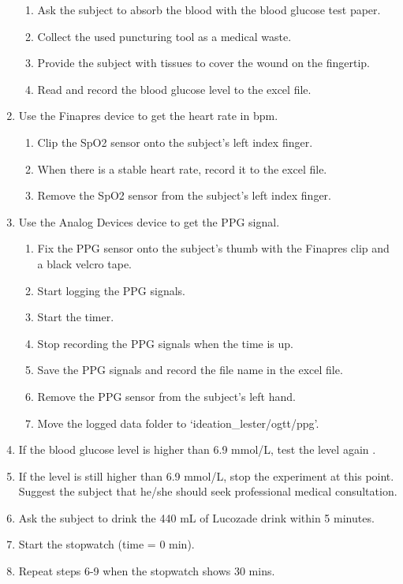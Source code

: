 \documentclass{article}
\begin{document}
\begin{enumerate}
\begin{enumerate}
    \item Ask the subject to absorb the blood with the blood glucose test paper.
    \item Collect the used puncturing tool as a medical waste.
    \item Provide the subject with tissues to cover the wound on the fingertip.
    \item Read and record the blood glucose level to the excel file.
    \end{enumerate}
\item Use the Finapres device to get the heart rate in bpm.
    \begin{enumerate}
    \item Clip the SpO2 sensor onto the subject's left index finger.
    \item When there is a stable heart rate, record it to the excel file.
    \item Remove the SpO2 sensor from the subject's left index finger.
    \end{enumerate}
\item Use the Analog Devices device to get the PPG signal.
    \begin{enumerate}
    \item Fix the PPG sensor onto the subject's thumb with the Finapres clip and a black velcro tape.
    \item Start logging the PPG signals.
    \item Start the timer.
    \item Stop recording the PPG signals when the time is up.
    \item Save the PPG signals and record the file name in the excel file.
    \item Remove the PPG sensor from the subject's left hand.
    \item Move the logged data folder to `ideation\_lester/ogtt/ppg'.
    \end{enumerate}
\item If the blood glucose level is higher than 6.9 mmol/L, test the level again \cite{noauthor_indicator_nodate}.
\item If the level is still higher than 6.9 mmol/L, stop the experiment at this point.
Suggest the subject that he/she should seek professional medical consultation.
\item Ask the subject to drink the 440 mL of Lucozade drink within 5 minutes.
\item Start the stopwatch (time = 0 min).
\item Repeat steps 6-9 when the stopwatch shows 30 mins.
\end{enumerate}



\end{document}
